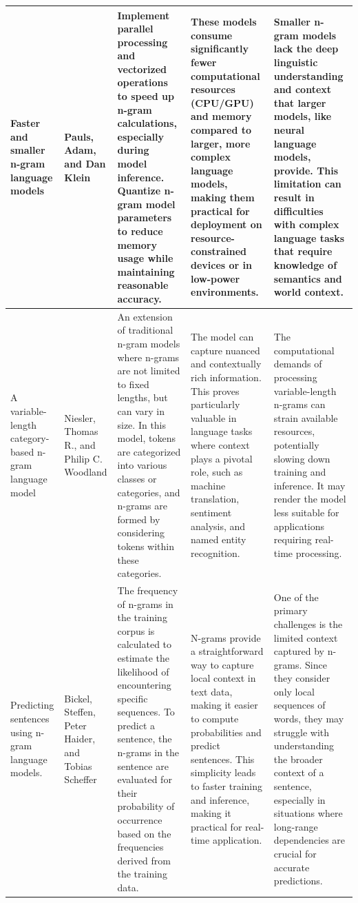 \documentclass[conference]{IEEEtran}
\begin{document}
\begin{table}
\begin{center}
\begin{tabular}{ |p{2cm}|p{2cm}|p{4cm}|p{3cm}|p{4cm}| }
\hline
[10]Faster and smaller n-gram language models &  Pauls, Adam, and Dan Klein &  Implement parallel processing and vectorized operations to speed up n-gram calculations, especially during model inference. Quantize n-gram model parameters to reduce memory usage while maintaining reasonable accuracy. &  These models consume significantly fewer computational resources (CPU/GPU) and memory compared to larger, more complex language models, making them practical for deployment on resource-constrained devices or in low-power environments. &  Smaller n-gram models lack the deep linguistic understanding and context that larger models, like neural language models, provide. This limitation can result in difficulties with complex language tasks that require knowledge of semantics and world context.  \\
\hline
[11] A variable-length category-based n-gram language model &  Niesler, Thomas R., and Philip C. Woodland & An extension of traditional n-gram models where n-grams are not limited to fixed lengths, but can vary in size. In this model, tokens are categorized into various classes or categories, and n-grams are formed by considering tokens within these categories. &  The model can capture nuanced and contextually rich information. This proves particularly valuable in language tasks where context plays a pivotal role, such as machine translation, sentiment analysis, and named entity recognition. & The computational demands of processing variable-length n-grams can strain available resources, potentially slowing down training and inference. It may render the model less suitable for applications requiring real-time processing. \\
\hline
[12] Predicting sentences using n-gram language models. &  Bickel, Steffen, Peter Haider, and Tobias Scheffer &  The frequency of n-grams in the training corpus is calculated to estimate the likelihood of encountering specific sequences. To predict a sentence, the n-grams in the sentence are evaluated for their probability of occurrence based on the frequencies derived from the training data. &  N-grams provide a straightforward way to capture local context in text data, making it easier to compute probabilities and predict sentences. This simplicity leads to faster training and inference, making it practical for real-time application. &  One of the primary challenges is the limited context captured by n-grams. Since they consider only local sequences of words, they may struggle with understanding the broader context of a sentence, especially in situations where long-range dependencies are crucial for accurate predictions.  \\

\end{tabular}
\end{center}
\end{table}
\end{document}
